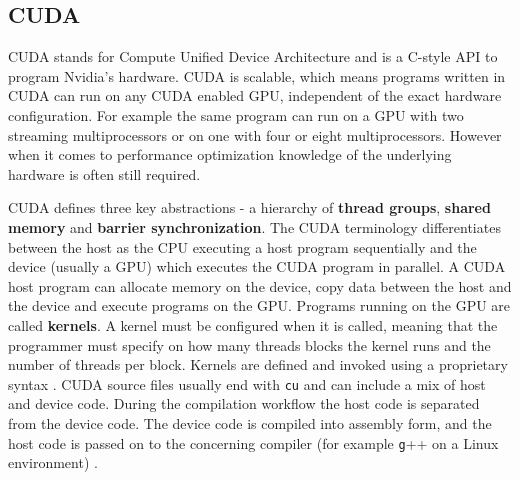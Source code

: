\subsection{CUDA}
\label{sec:cuda}

CUDA stands for Compute Unified Device Architecture and is a C-style API to program Nvidia's hardware. CUDA is scalable, which means programs written in CUDA can run on any CUDA enabled GPU, independent of the exact hardware configuration. For example the same program can run on a GPU with two streaming multiprocessors or on one with four or eight multiprocessors. However when it comes to performance optimization knowledge of the underlying hardware is often still required.

CUDA defines three key abstractions - a hierarchy of \textbf{thread groups}, \textbf{shared memory} and \textbf{barrier synchronization}. The CUDA terminology differentiates between the host as the CPU executing a host program sequentially and the device (usually a GPU) which executes the CUDA program in parallel. A CUDA host program can allocate memory on the device, copy data between the host and the device and execute programs on the GPU. Programs running on the GPU are called \textbf{kernels}. A kernel must be configured when it is called, meaning that the programmer must specify on how many threads blocks the kernel runs and the number of threads per block. Kernels are defined and invoked using a proprietary syntax \cite[2.1]{cudaguide}. CUDA source files usually end with \verb+cu+ and can include a mix of host and device code. During the compilation workflow the host code is separated from the device code. The device code is compiled into assembly form, and the host code is passed on to the concerning compiler (for example \verb+g+++ on a Linux environment) \cite[3.1]{cudaguide}.